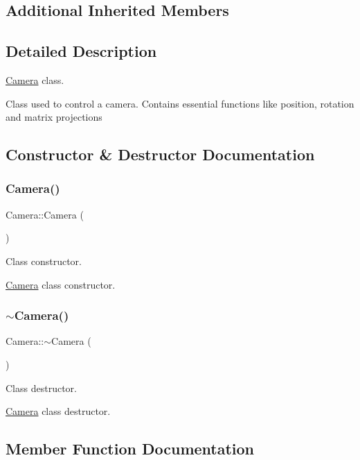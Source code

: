 \subsection*{Additional Inherited Members}


\subsection{Detailed Description}
\hyperlink{class_camera}{Camera} class. 

Class used to control a camera. Contains essential functions like position, rotation and matrix projections 

\subsection{Constructor \& Destructor Documentation}
\mbox{\label{class_camera_a01f94c3543f56ede7af49dc778f19331}} 
\subsubsection{\texorpdfstring{Camera()}{Camera()}}
{\footnotesize\ttfamily Camera\+::\+Camera (\begin{DoxyParamCaption}{ }\end{DoxyParamCaption})}



Class constructor. 

\hyperlink{class_camera}{Camera} class constructor. \mbox{\label{class_camera_ad1897942d0ccf91052386388a497349f}} 
\subsubsection{\texorpdfstring{$\sim$\+Camera()}{~Camera()}}
{\footnotesize\ttfamily Camera\+::$\sim$\+Camera (\begin{DoxyParamCaption}{ }\end{DoxyParamCaption})}



Class destructor. 

\hyperlink{class_camera}{Camera} class destructor. 

\subsection{Member Function Documentation}
\mbox{\label{class_camera_a0a515e9b67a4f4f9d012209431e45448}} 
